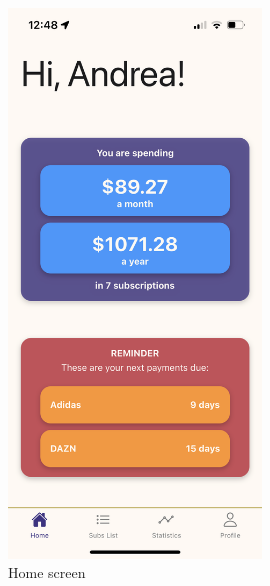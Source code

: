 \documentclass[12pt]{article}
\begin{document}
\begin{figure}[h!]
    \centering
    \begin{minipage}[c]{0.45\textwidth}
        \centering
        \includegraphics[width=0.6\textwidth, clip]{../../assets/smartphone/home.PNG}
        \caption{Home screen}
        \label{fig:home}
    \end{minipage}\hspace{1cm}%
    \begin{minipage}[c]{0.45\textwidth}
        \centering

\end{minipage}
\end{figure}
\end{document}
